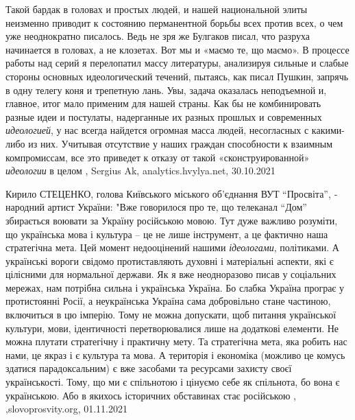 Такой бардак в головах и простых людей, и нашей национальной элиты неизменно
приводит к состоянию перманентной борьбы всех против всех, о чем уже
неоднократно писалось. Ведь не зря же Булгаков писал, что разруха начинается в
головах, а не клозетах. Вот мы и «маємо те, що маємо».
В процессе работы над серий я перелопатил массу литературы, анализируя сильные
и слабые стороны основных идеологический течений, пытаясь, как писал Пушкин,
запрячь в одну телегу коня и трепетную лань. Увы, задача оказалась неподъемной
и, главное, итог мало применим для нашей страны. Как бы не комбинировать разные
идеи и постулаты, надерганные их разных прошлых и современных \emph{идеологией}, у нас
всегда найдется огромная масса людей, несогласных с какими-либо из них.
Учитывая отсутствие у наших граждан способности к взаимным компромиссам, все
это приведет к отказу от такой «сконструированной» \emph{идеологии} в целом
, Sergius Ak, analytics.hvylya.net, 30.10.2021

Кирило СТЕЦЕНКО, голова Київського міського об’єднання ВУТ \enquote{Просвіта},
­народний артист України: "Вже говорилося про те, що телеканал \enquote{Дом}
збирається воювати за Україну російською мовою. Тут дуже важливо розуміти, що
українська мова і культура – це не лише інструмент, а це фактично наша
стратегічна мета.  Цей момент недооцінений нашими \emph{ідеологами},
політиками.  А українські вороги свідомо протиставляють духовні і матеріальні
аспекти, які є цілісними для нормальної держави. Як я вже неодноразово писав у
соціальних мережах, нам потрібна сильна і українська Україна. Бо слабка Україна
програє у протистоянні Росії, а неукраїнська Україна сама добровільно стане
частиною, включиться в цю імперію. Тому не можна допускати, щоб питання
української культури, мови, ідентичності перетворювалися лише на додаткові
елементи.  Не можна плутати стратегічну і практичну мету. Та стратегічна мета,
яка робить нас нами, це якраз і є культура та мова. А територія і економіка
(можливо це комусь здатися парадоксальним) є вже засобами та ресурсами захисту
своєї українськості. Тому, що ми є спільнотою і цінуємо себе як спільнота, бо
вона є українською. Або в якихось історичних обставинах стає російською
, ,slovoprosvity.org, 01.11.2021

